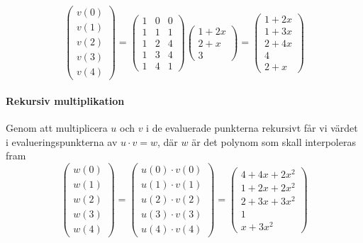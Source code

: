\begin{equation*}
  \begin{pmatrix}
    v(0) \\
    v(1) \\
    v(2) \\
    v(3) \\
    v(4)
  \end{pmatrix} =
  \begin{pmatrix}
    1 & 0 & 0 \\
    1 & 1 & 1 \\
    1 & 2 & 4 \\
    1 & 3 & 4 \\
    1 & 4 & 1
  \end{pmatrix}
  \begin{pmatrix}
    1 + 2x \\
    2 + x \\
    3
  \end{pmatrix} =
  \begin{pmatrix}
    1 + 2x \\
    1 + 3x \\
    2 + 4x \\
    4 \\
    2 + x
  \end{pmatrix}
\end{equation*}

\paragraph{Rekursiv multiplikation}
Genom att multiplicera $u$ och $v$ i de evaluerade punkterna rekursivt får vi
värdet i evalueringspunkterna av $u \cdot v = w$, där $w$ är det polynom som
skall interpoleras fram
\begin{equation*}
  \begin{pmatrix}
    w(0) \\
    w(1) \\
    w(2) \\
    w(3) \\
    w(4)
  \end{pmatrix} =
  \begin{pmatrix}
    u(0) \cdot v(0) \\
    u(1) \cdot v(1) \\
    u(2) \cdot v(2) \\
    u(3) \cdot v(3) \\
    u(4) \cdot v(4)
  \end{pmatrix} =
  \begin{pmatrix}
    4 + 4x + 2x^2 \\
    1 + 2x + 2x^2 \\
    2 + 3x + 3x^2 \\
    1 \\
    x + 3x^2
  \end{pmatrix}
\end{equation*}

